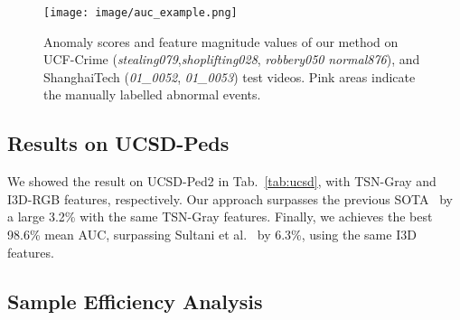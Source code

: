 \documentclass[10pt,twocolumn,letterpaper]{article}
\begin{document}
\begin{figure*}[h!]
\begin{center}
\texttt{[image: image/auc\_example.png]}
\end{center}
   \caption{Anomaly scores and feature magnitude values of our method on UCF-Crime (\textit{stealing079},\textit{shoplifting028}, \textit{robbery050} \textit{normal876}), and ShanghaiTech (\textit{01\_0052}, \textit{01\_0053}) test videos.
Pink areas indicate the manually labelled abnormal events. }
\label{fig:ucf_example}
\end{figure*}


\subsection{Results on UCSD-Peds}

We showed the result on UCSD-Ped2 in Tab.~\ref{tab:ucsd}, with TSN-Gray and I3D-RGB features, respectively. Our approach surpasses the previous SOTA~\cite{zhong2019graph} by a large 3.2\% with the same TSN-Gray features. Finally, we achieves the best 98.6\% mean AUC, surpassing Sultani et al.~\cite{sultani2018real} by 6.3\%, using the same I3D features.



\begin{table}[htbp]
\centering
{}
\caption{Comparison of AUC performance with other SOTA weakly-supervised methods on UCSD Ped2. * indicates we retrain the method in~\cite{sultani2018real} using I3D features. Best result in \textcolor{red}{\textbf{red}} and second best in \textcolor{blue}{\textbf{blue}}.}
\label{tab:ucsd}
\end{table}

\subsection{Sample Efficiency Analysis}
\end{document}
